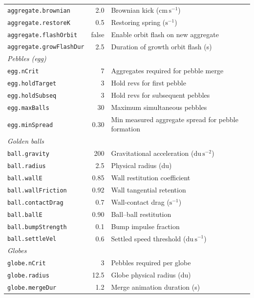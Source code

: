 \documentclass[12pt, a4paper]{article}
\begin{document}
\begin{longtable}{@{}lrl@{}}
  \texttt{aggregate.brownian}        & 2.0  & Brownian kick ($\mathrm{cm\,s^{-1}}$) \\
  \texttt{aggregate.restoreK}        & 0.5  & Restoring spring ($\mathrm{s^{-1}}$) \\
  \texttt{aggregate.flashOrbit}      & false & Enable orbit flash on new aggregate \\
  \texttt{aggregate.growFlashDur}    & 2.5  & Duration of growth orbit flash (s) \\
  \midrule
  \multicolumn{3}{l}{\textit{Pebbles (egg)}} \\
  \texttt{egg.nCrit}             & 7    & Aggregates required for pebble merge \\
  \texttt{egg.holdTarget}        & 3    & Hold revs for first pebble \\
  \texttt{egg.holdSubseq}        & 3    & Hold revs for subsequent pebbles \\
  \texttt{egg.maxBalls}          & 30   & Maximum simultaneous pebbles \\
  \texttt{egg.minSpread}         & 0.30 & Min measured aggregate spread for pebble formation \\
  \midrule
  \multicolumn{3}{l}{\textit{Golden balls}} \\
  \texttt{ball.gravity}          & 200  & Gravitational acceleration ($\mathrm{du\,s^{-2}}$) \\
  \texttt{ball.radius}           & 2.5  & Physical radius (du) \\
  \texttt{ball.wallE}            & 0.85 & Wall restitution coefficient \\
  \texttt{ball.wallFriction}     & 0.92 & Wall tangential retention \\
  \texttt{ball.contactDrag}      & 0.7  & Wall-contact drag ($\mathrm{s^{-1}}$) \\
  \texttt{ball.ballE}            & 0.90 & Ball--ball restitution \\
  \texttt{ball.bumpStrength}     & 0.1  & Bump impulse fraction \\
  \texttt{ball.settleVel}        & 0.6  & Settled speed threshold ($\mathrm{du\,s^{-1}}$) \\
  \midrule
  \multicolumn{3}{l}{\textit{Globes}} \\
  \texttt{globe.nCrit}           & 3      & Pebbles required per globe \\
  \texttt{globe.radius}          & 12.5   & Globe physical radius (du) \\
  \texttt{globe.mergeDur}        & 1.2    & Merge animation duration (s) \\

\end{longtable}
\end{document}
